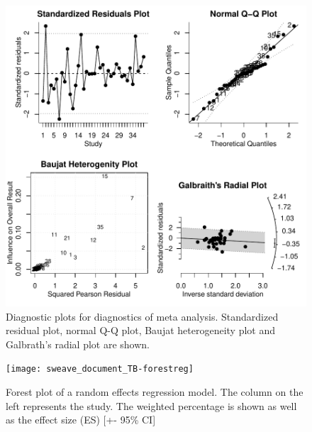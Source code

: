 \documentclass[11pt, a4paper]{article} %
\begin{document}
\begin{figure}
\captionsetup{width=0.6\textwidth}
\centering
\includegraphics[width=1\textwidth]{sweave_document_TB-diagnostics}
\caption{Diagnostic plots for diagnostics of meta analysis. Standardized residual plot, normal Q-Q plot, Baujat heterogeneity plot and Galbrath's radial plot are shown.}
\label{fig:diagnostics}
\end{figure}


\begin{figure}
\captionsetup{width=0.6\textwidth}
\centering
\texttt{[image: sweave\_document\_TB-forestreg]}
\caption{Forest plot of a random effects regression model. The column on the left represents the study. The weighted percentage is shown as well as the effect size (ES) [+- 95\% CI]}
\label{fig:forestplotreg}
\end{figure}
\end{document}
